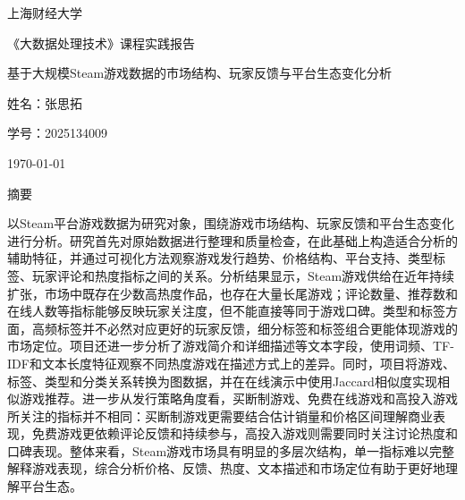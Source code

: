 \documentclass[UTF8,a4paper,12pt,fontset=fandol]{ctexart}
\newcommand{\covertopic}[1]{%
  {\zihao{4}\begin{minipage}{12.2cm}\centering #1\end{minipage}\par}
  \vspace{0.95cm}
}
\newcommand{\coveritem}[2]{%
  {\zihao{3}#1：#2\par}
  \vspace{0.75cm}
}
\newcommand{\reporttitle}{基于大规模Steam游戏数据的市场结构、玩家反馈与平台生态变化分析}
\newcommand{\studentname}{张思拓}
\newcommand{\studentid}{2025134009}
\begin{document}
\begin{titlepage}
  \thispagestyle{empty}
  \centering

  \vspace*{1.05cm}
  {\fontsize{32pt}{38pt}\selectfont\heiti 上海财经大学\par}

  \vspace{1.05cm}
  {\fontsize{26pt}{32pt}\selectfont\heiti 《大数据处理技术》课程实践报告\par}

  \vspace{3.0cm}
  \begin{center}
    \begin{minipage}{13.2cm}
      \centering
      \covertopic{\reporttitle}
      \coveritem{姓名}{\studentname}
      \coveritem{学号}{\studentid}
    \end{minipage}
  \end{center}

  \vfill
  { \today\par}
\end{titlepage}

\setcounter{page}{1}

\begin{center}
  {\heiti{} 摘要}
\end{center}

以Steam平台游戏数据为研究对象，围绕游戏市场结构、玩家反馈和平台生态变化进行分析。研究首先对原始数据进行整理和质量检查，在此基础上构造适合分析的辅助特征，并通过可视化方法观察游戏发行趋势、价格结构、平台支持、类型标签、玩家评论和热度指标之间的关系。分析结果显示，Steam游戏供给在近年持续扩张，市场中既存在少数高热度作品，也存在大量长尾游戏；评论数量、推荐数和在线人数等指标能够反映玩家关注度，但不能直接等同于游戏口碑。类型和标签方面，高频标签并不必然对应更好的玩家反馈，细分标签和标签组合更能体现游戏的市场定位。项目还进一步分析了游戏简介和详细描述等文本字段，使用词频、TF-IDF和文本长度特征观察不同热度游戏在描述方式上的差异。同时，项目将游戏、标签、类型和分类关系转换为图数据，并在在线演示中使用Jaccard相似度实现相似游戏推荐。进一步从发行策略角度看，买断制游戏、免费在线游戏和高投入游戏所关注的指标并不相同：买断制游戏更需要结合估计销量和价格区间理解商业表现，免费游戏更依赖评论反馈和持续参与，高投入游戏则需要同时关注讨论热度和口碑表现。整体来看，Steam游戏市场具有明显的多层次结构，单一指标难以完整解释游戏表现，综合分析价格、反馈、热度、文本描述和市场定位有助于更好地理解平台生态。
\end{document}
